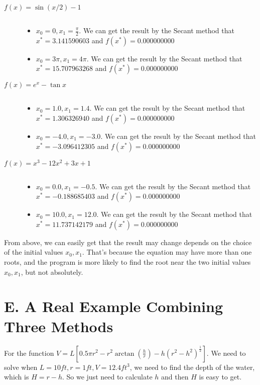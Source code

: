 \documentclass[a4paper]{article}
\begin{document}
\begin{description}
	\item[$f(x) = \sin (x/2) - 1$] $~$
	\begin{itemize}
		\item $x_0 = 0, x_1 = \frac{\pi}{2}$. We can get the result by the Secant method that $x^* = 3.141590603$ and $f(x^*) = 0.000000000$
		\item $x_0 = 3\pi, x_1 = 4\pi$. We can get the result by the Secant method that $x^* = 15.707963268$ and $f(x^*) = 0.000000000$
	\end{itemize}

	\item[$f(x) = e^x - \tan x$] $~$
	\begin{itemize}
		\item $x_0 = 1.0, x_1 = 1.4$. We can get the result by the Secant method that $x^* = 1.306326940$ and $f(x^*) = 0.000000000$
		\item $x_0 = -4.0, x_1 = -3.0$. We can get the result by the Secant method that $x^* = -3.096412305$ and $f(x^*) = 0.000000000$
	\end{itemize}

	\item[$f(x) = x^3 - 12x^2 + 3x + 1$] $~$
	\begin{itemize}
		\item $x_0 = 0.0, x_1 = -0.5$. We can get the result by the Secant method that $x^* = -0.188685403$ and $f(x^*) = 0.000000000$
		\item $x_0 = 10.0, x_1 = 12.0$. We can get the result by the Secant method that $x^* = 11.737142179$ and $f(x^*) = 0.000000000$
	\end{itemize}
\end{description}

From above, we can easily get that the result may change depends on the choice of the initial values $x_0, x_1$. That's because the equation may have more than one roots, and the program is more likely to find the root near the two initial values $x_0, x_1$, but not absolutely. 


\section*{E. A Real Example Combining Three Methods}

For the function $V = L [0.5\pi r^2 -r^2 \arctan (\frac{h}{r}) - h(r^2-h^2)^{\frac{1}{2}}]$. We need to solve when $L = 10ft, r = 1ft, V=12.4ft^3$, we need to find the depth of the water, which is $H = r - h$. So we just need to calculate $h$ and then $H$ is easy to get.
\end{document}
